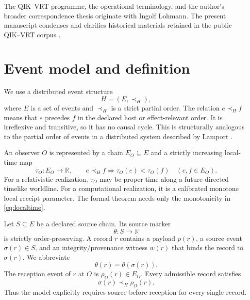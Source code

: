 \documentclass[11pt]{article}
\theoremstyle{remark}
\newcommand{\host}{\prec_{\!H}}
\begin{document}
The QIK--VRT programme, the operational terminology, and the author's broader
correspondence thesis originate with Ingolf Lohmann. The present manuscript
condenses and clarifies historical materials retained in the public QIK--VRT
corpus \cite{LohmannRoundTrip2026,LohmannRelationalTime2026,
LohmannDecisionSufficiency2026,LohmannMandelbrot2026,LohmannCanonicalMemory2026}.

\section{Event model and definition}
\label{sec:model}

We use a distributed event structure
\begin{equation}
  H=(E,\host),
\end{equation}
where $E$ is a set of events and $\host$ is a strict partial order. The
relation $e\host f$ means that $e$ precedes $f$ in the declared host or
effect-relevant order. It is irreflexive and transitive, so it has no causal
cycle. This is structurally analogous to the partial order of events in a
distributed system described by Lamport \cite{Lamport1978}.

An observer $O$ is represented by a chain $E_O\subseteq E$ and a strictly
increasing local-time map
\begin{equation}
  \tau_O:E_O\longrightarrow\mathbb{R},\qquad
  e\host f\Longrightarrow\tau_O(e)<\tau_O(f)\quad(e,f\in E_O).
  \label{eq:localtime}
\end{equation}
For a relativistic realization, $\tau_O$ may be proper time along a
future-directed timelike worldline. For a computational realization, it is a
calibrated monotone local receipt parameter. The formal theorem needs only the
monotonicity in \cref{eq:localtime}.

Let $S\subseteq E$ be a declared source chain. Its source marker
\begin{equation}
  \theta:S\longrightarrow\mathbb{R}
\end{equation}
is strictly order-preserving. A record $r$ contains a payload $p(r)$, a
source event $\sigma(r)\in S$, and an integrity/provenance witness $w(r)$
that binds the record to $\sigma(r)$. We abbreviate
\begin{equation}
  \theta(r)=\theta(\sigma(r)).
\end{equation}
The reception event of $r$ at $O$ is $\rho_O(r)\in E_O$. Every admissible
record satisfies
\begin{equation}
  \sigma(r)\host\rho_O(r).
  \label{eq:forwarddelivery}
\end{equation}
Thus the model explicitly requires source-before-reception for every single
record.
\end{document}
